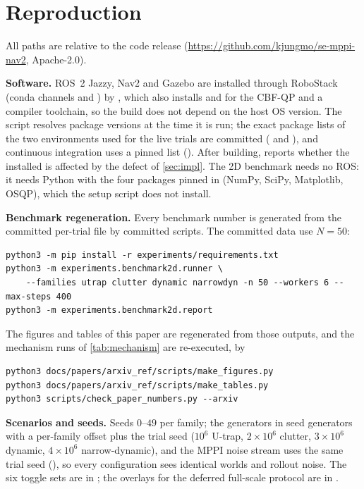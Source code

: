 \section{Reproduction}\label{app:repro}

All paths are relative to the code release (\url{https://github.com/kjungmo/se-mppi-nav2}, Apache-2.0).

\noindent\textbf{Software.} ROS~2 Jazzy, Nav2 and Gazebo are installed through RoboStack (conda channels  and ) by , which also installs  and  for the CBF-QP and a compiler toolchain, so the build does not depend on the host OS version. The script resolves package versions at the time it is run; the exact package lists of the two environments used for the live trials are committed ( and ), and continuous integration uses a pinned list (). After building,  reports whether the installed  is affected by the defect of \cref{sec:impl}. The 2D benchmark needs no ROS: it needs Python with the four packages pinned in  (NumPy, SciPy, Matplotlib, OSQP), which the setup script does not install.

\noindent\textbf{Benchmark regeneration.} Every benchmark number is generated from the committed per-trial file by committed scripts. The committed data use $N=50$:
{\small
\begin{verbatim}
python3 -m pip install -r experiments/requirements.txt
python3 -m experiments.benchmark2d.runner \
    --families utrap clutter dynamic narrowdyn -n 50 --workers 6 --max-steps 400
python3 -m experiments.benchmark2d.report
\end{verbatim}
}
\noindent The figures and tables of this paper are regenerated from those outputs, and the mechanism runs of \cref{tab:mechanism} are re-executed, by
{\small
\begin{verbatim}
python3 docs/papers/arxiv_ref/scripts/make_figures.py
python3 docs/papers/arxiv_ref/scripts/make_tables.py
python3 scripts/check_paper_numbers.py --arxiv
\end{verbatim}
}

\noindent\textbf{Scenarios and seeds.} Seeds $0$--$49$ per family; the generators in  seed  generators with a per-family offset plus the trial seed ($10^{6}$ U-trap, $2\times10^{6}$ clutter, $3\times10^{6}$ dynamic, $4\times10^{6}$ narrow-dynamic), and the MPPI noise stream uses the same trial seed (), so every configuration sees identical worlds and rollout noise. The six toggle sets are in ; the overlays for the deferred full-scale protocol are in .

